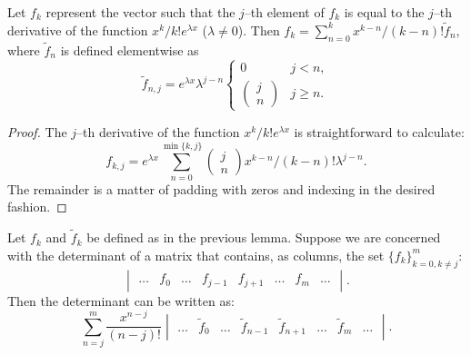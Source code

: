 \documentclass{book}
\begin{document}
\begin{lemma}
Let $f_k$ represent the vector such that the $j$--th element of $f_k$ is equal to the $j$--th derivative of the function $x^k/k! e^{\lambda x}$ ($\lambda \neq 0$).
Then $f_k = \sum_{n=0}^k x^{k-n}/(k-n)! \tilde{f}_n$, where $\tilde{f}_n$ is defined elementwise as
\begin{equation*}
\tilde{f}_{n,j} = e^{\lambda x} \lambda^{j-n} \begin{cases} 0 & j < n, \\ \begin{pmatrix} j \\ n \end{pmatrix} & j \geq n . \end{cases}
\end{equation*}
\label{lem:vec}
\end{lemma}

\begin{proof}
The $j$--th derivative of the function $x^k/k! e^{\lambda x}$ is straightforward to calculate:
\begin{equation*}
f_{k,j} = e^{\lambda x} \sum_{n=0}^{\min\{k,j\}} \begin{pmatrix}
j \\ n
\end{pmatrix}
x^{k-n}/(k-n)! \lambda^{j-n} .
\end{equation*}
The remainder is a matter of padding with zeros and indexing in the desired fashion.
\end{proof}

\begin{lemma}
Let $f_k$ and $\tilde{f}_k$ be defined as in the previous lemma.
Suppose we are concerned with the determinant of a matrix that contains, as columns, the set $\{f_k\}_{k=0, k \neq j}^m$:
\begin{equation*}
\begin{vmatrix} \dots & f_0 & \dots & f_{j-1} & f_{j+1} & \dots & f_m & \dots \end{vmatrix} .
\end{equation*}
Then the determinant can be written as:
\begin{equation*}
\sum_{n=j}^m \frac{x^{n-j}}{(n-j)!} \begin{vmatrix} \dots & \tilde{f}_0 & \dots & \tilde{f}_{n-1} & \tilde{f}_{n+1} & \dots & \tilde{f}_m & \dots \end{vmatrix} .
\end{equation*}
\label{lem:key}
\end{lemma}
\end{document}
